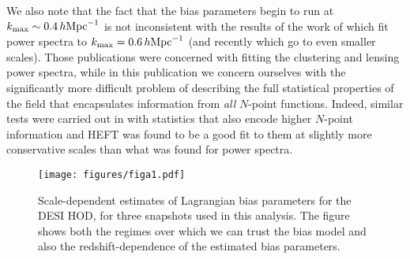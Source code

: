 \documentclass[fleqn,usenatbib]{mnras}
\newcommand{\ihmpc}{\,h{\rm Mpc}^{-1}}
\newcommand{\kmax}{k_{\rm max}}
\begin{document}
We also note that the fact that the bias parameters begin to run at $\kmax \sim 0.4 \ihmpc$ is not inconsistent with the results of the work of \cite{Kokron_2021} which fit power spectra to $\kmax = 0.6 \ihmpc$ (and recently \cite{zennaro2021priors} which go to even smaller scales). Those publications were concerned with fitting the clustering and lensing power spectra, while in this publication we concern ourselves with the significantly more difficult problem of describing the full statistical properties of the field that encapsulates information from \emph{all} $N$-point functions. Indeed, similar tests were carried out in \cite{banerjee2021modeling} with statistics that also encode higher $N$-point information and HEFT was found to be a good fit to them at slightly more conservative scales than what was found for power spectra. 
\begin{figure}
    \centering
    \texttt{[image: figures/figa1.pdf]}
    \caption{Scale-dependent estimates of Lagrangian bias parameters for the DESI HOD, for three snapshots used in this analysis. The figure shows both the regimes over which we can trust the bias model and also the redshift-dependence of the estimated bias parameters.}
    \label{fig:biastransfer}
\end{figure}
\end{document}

